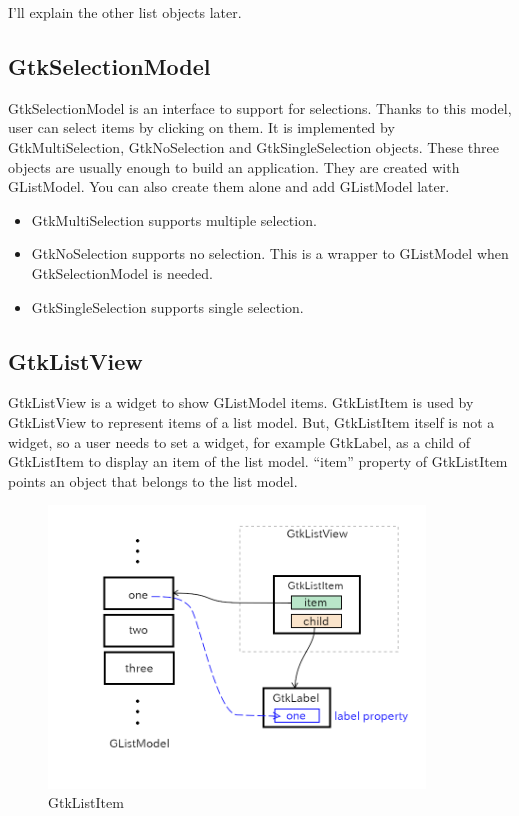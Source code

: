 I'll explain the other list objects later.

\hypertarget{gtkselectionmodel}{%
\subsection{GtkSelectionModel}\label{gtkselectionmodel}}

GtkSelectionModel is an interface to support for selections. Thanks to
this model, user can select items by clicking on them. It is implemented
by GtkMultiSelection, GtkNoSelection and GtkSingleSelection objects.
These three objects are usually enough to build an application. They are
created with GListModel. You can also create them alone and add
GListModel later.

\begin{itemize}
\tightlist
\item
  GtkMultiSelection supports multiple selection.
\item
  GtkNoSelection supports no selection. This is a wrapper to GListModel
  when GtkSelectionModel is needed.
\item
  GtkSingleSelection supports single selection.
\end{itemize}

\hypertarget{gtklistview-1}{%
\subsection{GtkListView}\label{gtklistview-1}}

GtkListView is a widget to show GListModel items. GtkListItem is used by
GtkListView to represent items of a list model. But, GtkListItem itself
is not a widget, so a user needs to set a widget, for example GtkLabel,
as a child of GtkListItem to display an item of the list model. ``item''
property of GtkListItem points an object that belongs to the list model.

\begin{figure}
\centering
\includegraphics[width=10cm,height=7.5cm]{../image/gtklistitem.png}
\caption{GtkListItem}
\end{figure}

